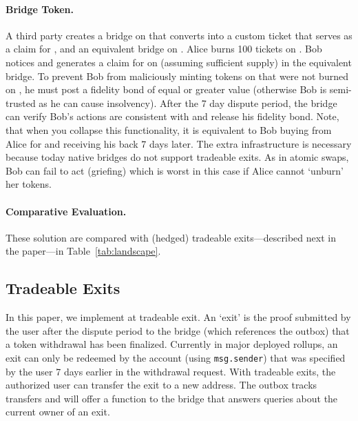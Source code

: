 \paragraph{Bridge Token.} A third party creates a bridge on \layertwo that converts \ethtwo into a custom ticket that serves as a claim for \ethtwo, and an equivalent bridge on \layerone. Alice burns 100 tickets on \layertwo. Bob notices and generates a claim for \ethone on \layerone (assuming sufficient supply) in the equivalent \layerone bridge. To prevent Bob from maliciously minting tokens on \layerone that were not burned on \layertwo, he must post a fidelity bond of equal or greater value (otherwise Bob is semi-trusted as he can cause insolvency). After the 7 day dispute period, the \layerone bridge can verify Bob's actions are consistent with \layertwo and release his fidelity bond. Note, that when you collapse this functionality, it is equivalent to Bob buying \ethxx from Alice for \ethone and receiving his \ethone back 7 days later. The extra infrastructure is necessary because today native bridges do not support tradeable exits. As in atomic swaps, Bob can fail to act (griefing) which is worst in this case if Alice cannot `unburn' her tokens.

\paragraph{Comparative Evaluation.} These solution are compared with (hedged) tradeable exits---described next in the paper---in Table~\ref{tab:landscape}.
 

\subsection{Tradeable Exits} 

In this paper, we implement at tradeable exit. An `exit' is the proof submitted by the user after the dispute period to the bridge (which references the outbox) that a token withdrawal has been finalized. Currently in major deployed rollups, an exit can only be redeemed by the account (\ie using \texttt{msg.sender}) that was specified by the user 7 days earlier in the \layertwo withdrawal request. With tradeable exits, the authorized user can transfer the exit to a new address. The outbox tracks transfers and will offer a function to the bridge that answers queries about the current owner of an exit.

